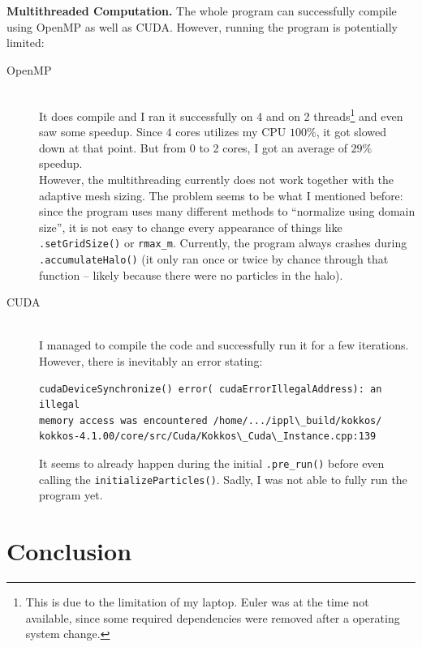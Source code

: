 \textbf{Multithreaded Computation.} The whole program can successfully compile using OpenMP as well as CUDA. However, running the program is potentially limited:
\begin{description}
    \item[OpenMP] \hfill \\
    It does compile and I ran it successfully on 4 and on 2 threads\footnote{This is due to the limitation of my laptop. Euler was at the time not available, since some required dependencies were removed after a operating system change.} and even saw some speedup. Since $4$ cores utilizes my CPU $100\%$, it got slowed down at that point. But from 0 to 2 cores, I got an average of $29\%$ speedup. \\
    However, the multithreading currently does not work together with the adaptive mesh sizing. The problem seems to be what I mentioned before: since the program uses many different methods to ``normalize using domain size'', it is not easy to change every appearance of things like \texttt{.setGridSize()} or \texttt{rmax\_m}. Currently, the program always crashes during \texttt{.accumulateHalo()} (it only ran once or twice by chance through that function -- likely because there were no particles in the halo).

    \item[CUDA] \hfill \\
    I managed to compile the code and successfully run it for a few iterations. However, there is inevitably an error stating: 
    \begin{verbatim}
cudaDeviceSynchronize() error( cudaErrorIllegalAddress): an illegal 
memory access was encountered /home/.../ippl\_build/kokkos/
kokkos-4.1.00/core/src/Cuda/Kokkos\_Cuda\_Instance.cpp:139
    \end{verbatim}
    It seems to already happen during the initial \texttt{.pre\_run()} before even calling the \texttt{initializeParticles()}. Sadly, I was not able to fully run the program yet.
\end{description}


\section{Conclusion}

